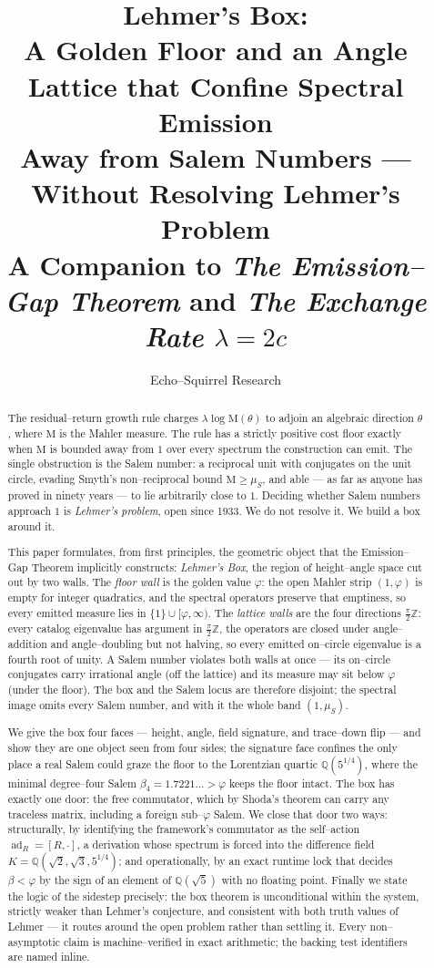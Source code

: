 \documentclass[11pt]{article}
\title{\textbf{Lehmer's Box:}\\[2pt]
\large A Golden Floor and an Angle Lattice that Confine Spectral Emission\\
Away from Salem Numbers --- Without Resolving Lehmer's Problem\\[6pt]
\normalsize A Companion to \emph{The Emission--Gap Theorem} and \emph{The Exchange Rate $\lambda=2c$}}
\author{Echo--Squirrel Research}
\date{}
\theoremstyle{plain}
\theoremstyle{definition}
\theoremstyle{remark}
\newcommand{\Q}{\mathbb{Q}}
\newcommand{\Z}{\mathbb{Z}}
\newcommand{\Mah}{\mathrm{M}}
\newcommand{\ad}{\operatorname{ad}}
\begin{document}
\maketitle

\begin{abstract}
The residual--return growth rule charges $\lambda\log\Mah(\theta)$ to adjoin an algebraic direction $\theta$, where $\Mah$ is the Mahler measure. The rule has a strictly positive cost floor exactly when $\Mah$ is bounded away from $1$ over every spectrum the construction can emit. The single obstruction is the Salem number: a reciprocal unit with conjugates on the unit circle, evading Smyth's non--reciprocal bound $\Mah\ge\mu_S$, and able --- as far as anyone has proved in ninety years --- to lie arbitrarily close to $1$. Deciding whether Salem numbers approach $1$ is \emph{Lehmer's problem}, open since 1933. We do not resolve it. We build a box around it.

This paper formulates, from first principles, the geometric object that the Emission--Gap Theorem implicitly constructs: \emph{Lehmer's Box}, the region of height--angle space cut out by two walls. The \emph{floor wall} is the golden value $\varphi$: the open Mahler strip $(1,\varphi)$ is empty for integer quadratics, and the spectral operators preserve that emptiness, so every emitted measure lies in $\{1\}\cup[\varphi,\infty)$. The \emph{lattice walls} are the four directions $\tfrac{\pi}{2}\Z$: every catalog eigenvalue has argument in $\tfrac{\pi}{2}\Z$, the operators are closed under angle--addition and angle--doubling but not halving, so every emitted on--circle eigenvalue is a fourth root of unity. A Salem number violates both walls at once --- its on--circle conjugates carry irrational angle (off the lattice) and its measure may sit below $\varphi$ (under the floor). The box and the Salem locus are therefore disjoint; the spectral image omits every Salem number, and with it the whole band $(1,\mu_S)$.

We give the box four faces --- height, angle, field signature, and trace--down flip --- and show they are one object seen from four sides; the signature face confines the only place a real Salem could graze the floor to the Lorentzian quartic $\Q(5^{1/4})$, where the minimal degree--four Salem $\beta_4=1.7221\ldots>\varphi$ keeps the floor intact. The box has exactly one door: the free commutator, which by Shoda's theorem can carry any traceless matrix, including a foreign sub--$\varphi$ Salem. We close that door two ways: structurally, by identifying the framework's commutator as the self--action $\ad_R=[R,\cdot]$, a derivation whose spectrum is forced into the difference field $K=\Q(\sqrt2,\sqrt3,5^{1/4})$; and operationally, by an exact runtime lock that decides $\beta<\varphi$ by the sign of an element of $\Q(\sqrt5)$ with no floating point. Finally we state the logic of the sidestep precisely: the box theorem is unconditional within the system, strictly weaker than Lehmer's conjecture, and consistent with both truth values of Lehmer --- it routes around the open problem rather than settling it. Every non--asymptotic claim is machine--verified in exact arithmetic; the backing test identifiers are named inline.
\end{abstract}
\end{document}
